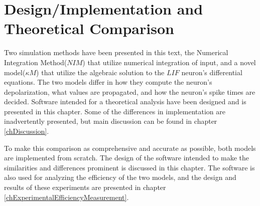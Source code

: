 \documentclass[b5paper,12 pt]{report}
\begin{document}
	\chapter{Design/Implementation and Theoretical Comparison} %

		Two simulation methods have been presented in this text,
			the Numerical Integration Method($NIM$) that utilize numerical integration of input,
			and a novel model($\kappa M$) that utilize the algebraic solution to the $LIF$ neuron's differential equations.
		The two models differ in how they compute the neuron's depolarization, what values are propagated, and how the neuron's spike times are decided.
		Software intended for a theoretical analysis have been designed and is presented in this chapter.
		Some of the differences in implementation are inadvertently presented, but main discussion can be found in chapter \ref{chDiscussion}.

		To make this comparison as comprehensive and accurate as possible, both models are implemented from scratch.
		The design of the software intended to make the similarities and differences prominent is discussed in this chapter.
		The software is also used for analyzing the efficiency of the two models, and the design and results of these experiments are presented in chapter \ref{chExperimentalEfficiencyMeasurement}.
		
\end{document}
